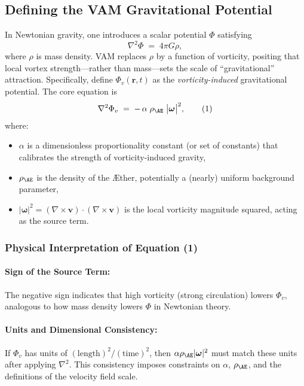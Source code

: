 \subsection{Defining the VAM Gravitational Potential}
In Newtonian gravity, one introduces a scalar potential \(\Phi\) satisfying
\[
    \nabla^2 \Phi \;=\; 4 \pi G \rho,
\]
where \(\rho\) is mass density. VAM replaces \(\rho\) by a function of vorticity, positing that local vortex strength—rather than mass—sets the scale of “gravitational” attraction. Specifically, define \(\Phi_v(\mathbf{r},t)\) as the \textit{vorticity-induced} gravitational potential. The core equation is
\[
    \nabla^2 \Phi_v \;=\; -\,\alpha \;\rho_{\mathrm{\AE}}\;\bigl|\boldsymbol{\omega}\bigr|^2,
    \tag{1}
\]
where:
\begin{itemize}
    \item \(\alpha\) is a dimensionless proportionality constant (or set of constants) that calibrates the strength of vorticity-induced gravity,
    \item \(\rho_{\mathrm{\AE}}\) is the density of the Æther, potentially a (nearly) uniform background parameter,
    \item \(\lvert \boldsymbol{\omega} \rvert^2 = (\nabla \times \mathbf{v})\cdot(\nabla \times \mathbf{v})\) is the local vorticity magnitude squared, acting as the source term.
\end{itemize}

\subsubsection{Physical Interpretation of Equation (1)}

\paragraph{Sign of the Source Term:} The negative sign indicates that high vorticity (strong circulation) lowers \(\Phi_v\), analogous to how mass density lowers \(\Phi\) in Newtonian theory.

\paragraph{Units and Dimensional Consistency:} If \(\Phi_v\) has units of \((\text{length})^2/(\text{time})^2\), then \(\alpha \rho_{\mathrm{\AE}} \lvert \boldsymbol{\omega} \rvert^2\) must match these units after applying \(\nabla^2\). This consistency imposes constraints on \(\alpha\), \(\rho_{\mathrm{\AE}}\), and the definitions of the velocity field scale.


